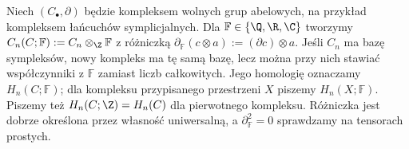 \begin{definicja}
\label{def:homologia-ciala-char-zero}
Niech $(C_\bullet,\partial)$ będzie kompleksem
wolnych grup abelowych, na przykład
kompleksem łańcuchów symplicjalnych.
Dla $\mathbb F\in\{\Q,\R,\C\}$ tworzymy
$C_n(C;\mathbb F):=C_n\otimes_{\Z}\mathbb F$ z różniczką
$\partial_{\mathbb F}(c\otimes a):=(\partial c)\otimes a$.
Jeśli $C_n$ ma bazę sympleksów, nowy kompleks
ma tę samą bazę, lecz można przy nich stawiać
współczynniki z $\mathbb F$ zamiast liczb całkowitych.
Jego homologię oznaczamy $H_n(C;\mathbb F)$;
dla kompleksu przypisanego przestrzeni $X$
piszemy $H_n(X;\mathbb F)$.
Piszemy też $H_n(C;\Z)=H_n(C)$ dla pierwotnego kompleksu.
Różniczka jest dobrze określona przez własność uniwersalną,
a $\partial_{\mathbb F}^2=0$ sprawdzamy na tensorach prostych.
\end{definicja}

